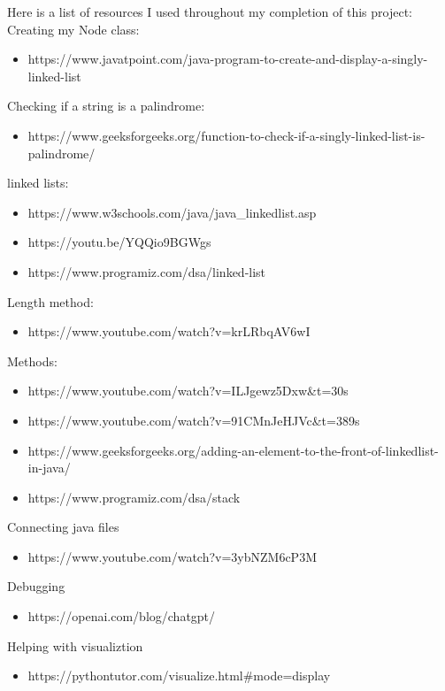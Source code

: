 \documentclass[a4paper,12pt]{article}
\begin{document}
Here is a list of resources I used throughout my completion of this project:\\
    
Creating my Node class:
    \begin{itemize}
    \item https://www.javatpoint.com/java-program-to-create-and-display-a-singly-linked-list 
    \end{itemize}
Checking if a string is a palindrome:
    \begin{itemize}
    \item https://www.geeksforgeeks.org/function-to-check-if-a-singly-linked-list-is-palindrome/
    \end{itemize}
linked lists:
    \begin{itemize}
    \item https://www.w3schools.com/java/java_linkedlist.asp
    \item https://youtu.be/YQQio9BGWgs 
    \item https://www.programiz.com/dsa/linked-list 
    \end{itemize}
Length method:
    \begin{itemize}
    \item https://www.youtube.com/watch?v=krLRbqAV6wI
    \end{itemize}
Methods:
    \begin{itemize}
    \item https://www.youtube.com/watch?v=ILJgewz5Dxw&t=30s
    \item https://www.youtube.com/watch?v=91CMnJeHJVc&t=389s
    \item https://www.geeksforgeeks.org/adding-an-element-to-the-front-of-linkedlist-in-java/
    \item https://www.programiz.com/dsa/stack
    \end{itemize}
Connecting java files
    \begin{itemize}
        \item https://www.youtube.com/watch?v=3ybNZM6cP3M 
    \end{itemize}
Debugging
    \begin{itemize}
        \item https://openai.com/blog/chatgpt/ 
    \end{itemize}
Helping with visualiztion 
    \begin{itemize}
        \item https://pythontutor.com/visualize.html#mode=display
    \end{itemize}
\end{document}
